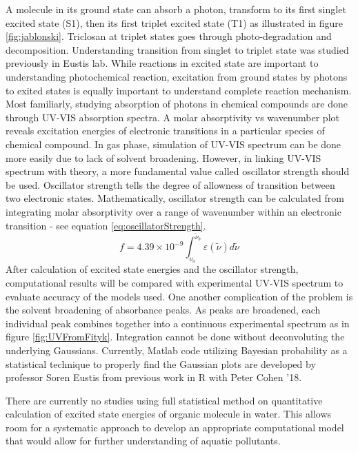 \documentclass[
journal=jpcbfk, %
manuscript=article]{achemso}
\begin{document}
A molecule in its ground state can absorb a photon, transform to its first singlet excited state (S1), then its first triplet excited state (T1) as illustrated in figure \ref{fig:jablonski}. Triclosan at triplet states goes through photo-degradation and decomposition. Understanding transition from singlet to triplet state was studied previously in Eustis lab.\cite{Ricke2014} While reactions in excited state are important to understanding photochemical reaction, excitation from ground states by photons to exited states is equally important to understand complete reaction mechanism. Most familiarly, studying absorption of photons in chemical compounds are done through UV-VIS absorption spectra. A molar absorptivity vs wavenumber plot reveals excitation energies of electronic transitions in a particular species of chemical compound. In gas phase, simulation of UV-VIS spectrum can be done more easily due to lack of solvent broadening.\cite{Hirayama2010} However, in linking UV-VIS spectrum with theory, a more fundamental value called oscillator strength should be used. Oscillator strength tells the degree of allowness of transition between two electronic states. Mathematically, oscillator strength can be calculated from integrating molar absorptivity over a range of wavenumber within an electronic transition - see equation \ref{eq:oscillatorStrength}.\cite{Klan2009}
\begin{equation}
\label{eq:oscillatorStrength}
f = 4.39\times 10^{-9}\int_{\widetilde{\nu}_{a}}^{\widetilde{\nu}_{b}}\varepsilon(\widetilde{\nu}) d\widetilde{\nu}
\end{equation}
After calculation of excited state energies and the oscillator strength, computational results will be compared with experimental UV-VIS spectrum to evaluate accuracy of the models used. One another complication of the problem is the solvent broadening of absorbance peaks. As peaks are broadened, each individual peak combines together into a continuous experimental spectrum as in figure \ref{fig:UVFromFityk}. Integration cannot be done without deconvoluting the underlying Gaussians. Currently, Matlab code utilizing Bayesian probability as a statistical technique to properly find the Gaussian plots are developed by professor Soren Eustis from previous work in R with Peter Cohen '18.

 There are currently no studies using full statistical method on quantitative calculation of excited state energies of organic molecule in water. This allows room for a systematic approach to develop an appropriate computational model that would allow for further understanding of aquatic pollutants.
\end{document}
